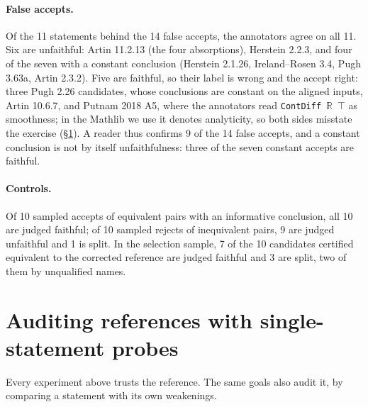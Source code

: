 \documentclass[10pt]{article}
\theoremstyle{definition}
\begin{document}
\paragraph{False accepts.} Of the 11 statements behind the 14 false accepts, the annotators agree
on all 11. Six are unfaithful: Artin 11.2.13 (the four absorptions), Herstein 2.2.3, and four of
the seven with a constant conclusion (Herstein 2.1.26, Ireland--Rosen 3.4, Pugh 3.63a, Artin
2.3.2). Five are faithful, so their label is wrong and the accept right: three Pugh 2.26
candidates, whose conclusions are constant on the aligned inputs, Artin 10.6.7, and Putnam 2018
A5, where the annotators read \texttt{ContDiff}~$\mathbb R$~$\top$ as smoothness; in the Mathlib
we use it denotes analyticity, so both sides misstate the exercise (\S\ref{sec:audit}). A reader
thus confirms 9 of the 14 false accepts, and a constant conclusion is not by itself
unfaithfulness: three of the seven constant accepts are faithful.

\paragraph{Controls.} Of 10 sampled accepts of equivalent pairs with an informative conclusion,
all 10 are judged faithful; of 10 sampled rejects of inequivalent pairs, 9 are judged unfaithful
and 1 is split. In the selection sample, 7 of the 10 candidates certified equivalent to the
corrected reference are judged faithful and 3 are split, two of them by unqualified names.

\section{Auditing references with single-statement probes}\label{sec:audit}

Every experiment above trusts the reference. The same goals also audit it, by comparing a
statement with its own weakenings.
\end{document}
